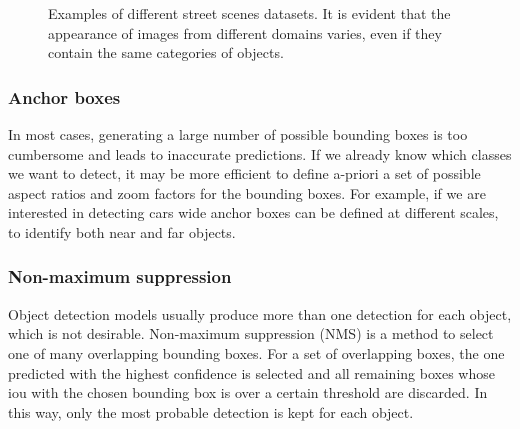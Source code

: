 \documentclass[%
    corpo=12pt,
    twoside,
    stile=classica,   
    tipotesi=magistrale,
    evenboxes,
    english,
	numerazioneromana,
]{toptesi}
\begin{document}
\begin{figure}[ht]
	\centering
	\caption{Examples of different street scenes datasets. It is evident that the appearance of images from different domains varies, even if they contain the same categories of objects.}
	\label{fig:datasets}
\end{figure}

\subsubsection{Anchor boxes}\label{sec:anchor}
In most cases, generating a large number of possible bounding boxes is too cumbersome and leads to inaccurate predictions. If we already know which classes we want to detect, it may be more efficient to define a-priori a set of possible aspect ratios and zoom factors for the bounding boxes. For example, if we are interested in detecting cars wide anchor boxes can be defined at different scales, to identify both near and far objects.

\subsubsection{Non-maximum suppression}
Object detection models usually produce more than one detection for each object, which is not desirable. Non-maximum suppression (NMS) is a method to select one of many overlapping bounding boxes. For a set of overlapping boxes, the one predicted with the highest confidence is selected and all remaining boxes whose \gls{iou} with the chosen bounding box is over a certain threshold are discarded. In this way, only the most probable detection is kept for each object.
\end{document}
